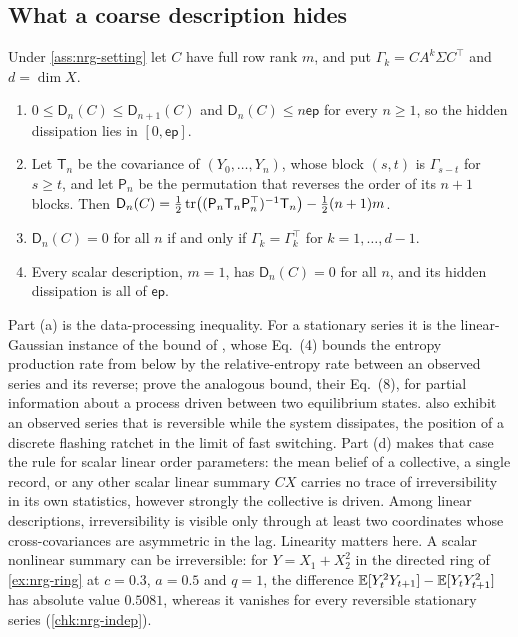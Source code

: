 \subsection{What a coarse description hides}\label{sec:nrg-coarse}

\begin{theorem}\label{thm:nrg-coarse}
Under \cref{ass:nrg-setting} let $C$ have full row rank $m$, and put $\Gamma_k=CA^k\Sigma C^\top$ and $d=\dim X$.
\begin{enumerate}
\item[(a)] $0\le\mathsf D_n(C)\le\mathsf D_{n+1}(C)$ and $\mathsf D_n(C)\le n\mathsf{ep}$ for every $n\ge1$, so the hidden dissipation lies in $[0,\mathsf{ep}]$.
\item[(b)] Let $\mathsf T_n$ be the covariance of $(Y_0,\dots,Y_n)$, whose block $(s,t)$ is $\Gamma_{s-t}$ for $s\ge t$, and let $\mathsf P_n$ be the permutation that reverses the order of its $n+1$ blocks. Then $\mathsf D_n(C)=\tfrac12\operatorname{tr}\bigl((\mathsf P_n\mathsf T_n\mathsf P_n^\top)^{-1}\mathsf T_n\bigr)-\tfrac12(n+1)m$.
\item[(c)] $\mathsf D_n(C)=0$ for all $n$ if and only if $\Gamma_k=\Gamma_k^\top$ for $k=1,\dots,d-1$.
\item[(d)] Every scalar description, $m=1$, has $\mathsf D_n(C)=0$ for all $n$, and its hidden dissipation is all of $\mathsf{ep}$.
\end{enumerate}
\end{theorem}

Part (a) is the data-processing inequality. For a stationary series it is the linear-Gaussian instance of the bound of \citet{roldan2010estimating}, whose Eq.~(4) bounds the entropy production rate from below by the relative-entropy rate between an observed series and its reverse; \citet{gomezmarin2007bounding} prove the analogous bound, their Eq.~(8), for partial information about a process driven between two equilibrium states. \citet{roldan2010estimating} also exhibit an observed series that is reversible while the system dissipates, the position of a discrete flashing ratchet in the limit of fast switching. Part (d) makes that case the rule for scalar linear order parameters: the mean belief of a collective, a single record, or any other scalar linear summary $CX$ carries no trace of irreversibility in its own statistics, however strongly the collective is driven. Among linear descriptions, irreversibility is visible only through at least two coordinates whose cross-covariances are asymmetric in the lag. Linearity matters here. A scalar nonlinear summary can be irreversible: for $Y=X_1+X_2^2$ in the directed ring of \cref{ex:nrg-ring} at $c=0.3$, $a=0.5$ and $q=1$, the difference $\mathbb{E}[Y_t^2Y_{t+1}]-\mathbb{E}[Y_tY_{t+1}^2]$ has absolute value $0.5081$, whereas it vanishes for every reversible stationary series (\cref{chk:nrg-indep}).

